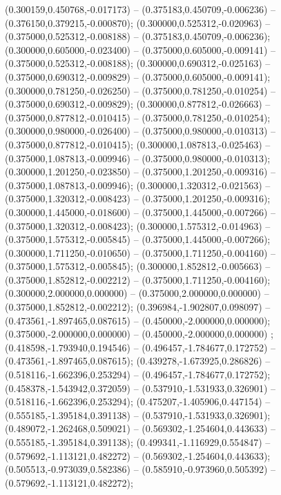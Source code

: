  (0.300159,0.450768,-0.017173) -- (0.375183,0.450709,-0.006236) -- (0.376150,0.379215,-0.000870);
 (0.300000,0.525312,-0.020963) -- (0.375000,0.525312,-0.008188) -- (0.375183,0.450709,-0.006236);
 (0.300000,0.605000,-0.023400) -- (0.375000,0.605000,-0.009141) -- (0.375000,0.525312,-0.008188);
 (0.300000,0.690312,-0.025163) -- (0.375000,0.690312,-0.009829) -- (0.375000,0.605000,-0.009141);
 (0.300000,0.781250,-0.026250) -- (0.375000,0.781250,-0.010254) -- (0.375000,0.690312,-0.009829);
 (0.300000,0.877812,-0.026663) -- (0.375000,0.877812,-0.010415) -- (0.375000,0.781250,-0.010254);
 (0.300000,0.980000,-0.026400) -- (0.375000,0.980000,-0.010313) -- (0.375000,0.877812,-0.010415);
 (0.300000,1.087813,-0.025463) -- (0.375000,1.087813,-0.009946) -- (0.375000,0.980000,-0.010313);
 (0.300000,1.201250,-0.023850) -- (0.375000,1.201250,-0.009316) -- (0.375000,1.087813,-0.009946);
 (0.300000,1.320312,-0.021563) -- (0.375000,1.320312,-0.008423) -- (0.375000,1.201250,-0.009316);
 (0.300000,1.445000,-0.018600) -- (0.375000,1.445000,-0.007266) -- (0.375000,1.320312,-0.008423);
 (0.300000,1.575312,-0.014963) -- (0.375000,1.575312,-0.005845) -- (0.375000,1.445000,-0.007266);
 (0.300000,1.711250,-0.010650) -- (0.375000,1.711250,-0.004160) -- (0.375000,1.575312,-0.005845);
 (0.300000,1.852812,-0.005663) -- (0.375000,1.852812,-0.002212) -- (0.375000,1.711250,-0.004160);
 (0.300000,2.000000,0.000000) -- (0.375000,2.000000,0.000000) -- (0.375000,1.852812,-0.002212);
 (0.396984,-1.902807,0.098097) -- (0.473561,-1.897465,0.087615) -- (0.450000,-2.000000,0.000000);
 (0.375000,-2.000000,0.000000) -- (0.450000,-2.000000,0.000000) ;
 (0.418598,-1.793940,0.194546) -- (0.496457,-1.784677,0.172752) -- (0.473561,-1.897465,0.087615);
 (0.439278,-1.673925,0.286826) -- (0.518116,-1.662396,0.253294) -- (0.496457,-1.784677,0.172752);
 (0.458378,-1.543942,0.372059) -- (0.537910,-1.531933,0.326901) -- (0.518116,-1.662396,0.253294);
 (0.475207,-1.405906,0.447154) -- (0.555185,-1.395184,0.391138) -- (0.537910,-1.531933,0.326901);
 (0.489072,-1.262468,0.509021) -- (0.569302,-1.254604,0.443633) -- (0.555185,-1.395184,0.391138);
 (0.499341,-1.116929,0.554847) -- (0.579692,-1.113121,0.482272) -- (0.569302,-1.254604,0.443633);
 (0.505513,-0.973039,0.582386) -- (0.585910,-0.973960,0.505392) -- (0.579692,-1.113121,0.482272);
